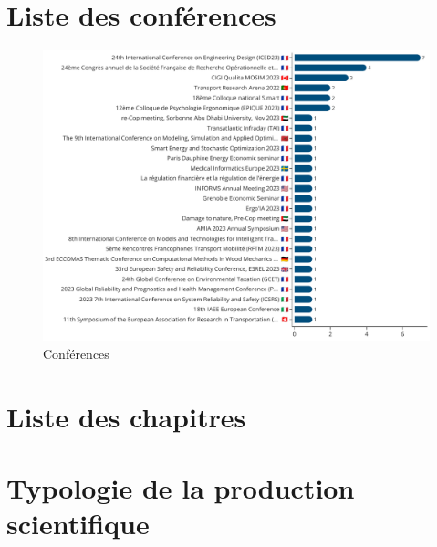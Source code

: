 \documentclass[french, 11pt]{../../dibiso/biso}
\begin{document}
{
  \footnotesize
  
}

\pagebreak

\section{Liste des conférences}

\begin{figure}[!h]
  \includegraphics[width=\textwidth]{figures/conferences.pdf}
  \centering
  \caption{Conférences}
  \label{fig_conferences}
\end{figure}


\pagebreak

\section{Liste des chapitres}

{
  \footnotesize
  
}


\pagebreak

\section{Typologie de la production scientifique}
\end{document}
